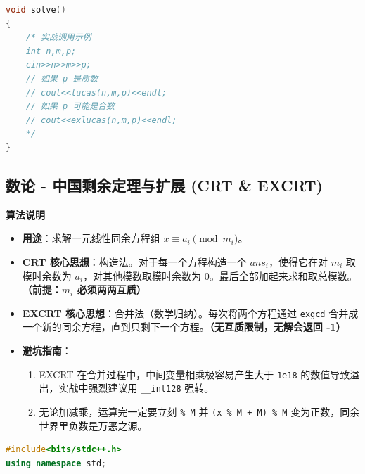 \documentclass[10pt,landscape,a4paper]{article}
\begin{document}
\begin{multicols*}{3}
\begin{lstlisting}[language=C++]
void solve()
{
    /* 实战调用示例
    int n,m,p;
    cin>>n>>m>>p;
    // 如果 p 是质数
    // cout<<lucas(n,m,p)<<endl;
    // 如果 p 可能是合数
    // cout<<exlucas(n,m,p)<<endl;
    */
}
\end{lstlisting}
\subsection*{数论 - 中国剩余定理与扩展 (CRT \& EXCRT)}
\par\addvspace{0.7ex}\noindent\textbf{算法说明}\par\nobreak
\begin{itemize}
\item \textbf{用途}：求解一元线性同余方程组 $x \equiv a_i \pmod{m_i}$。
\item \textbf{CRT 核心思想}：构造法。对于每一个方程构造一个 $ans_i$，使得它在对 $m_i$ 取模时余数为 $a_i$，对其他模数取模时余数为 $0$。最后全部加起来求和取总模数。\textbf{（前提：$m_i$ 必须两两互质）}
\item \textbf{EXCRT 核心思想}：合并法（数学归纳）。每次将两个方程通过 \texttt{e\allowbreak{}x\allowbreak{}g\allowbreak{}c\allowbreak{}d} 合并成一个新的同余方程，直到只剩下一个方程。\textbf{（无互质限制，无解会返回 -1）}
\item \textbf{避坑指南}：
\begin{enumerate}[start=1]
\item EXCRT 在合并过程中，中间变量相乘极容易产生大于 \texttt{1\allowbreak{}e\allowbreak{}1\allowbreak{}8} 的数值导致溢出，实战中强烈建议用 \texttt{\_\allowbreak{}\_\allowbreak{}i\allowbreak{}n\allowbreak{}t\allowbreak{}1\allowbreak{}2\allowbreak{}8} 强转。
\item 无论加减乘，运算完一定要立刻 \texttt{\%\allowbreak{} \allowbreak{}M} 并 \texttt{(\allowbreak{}x\allowbreak{} \allowbreak{}\%\allowbreak{} \allowbreak{}M\allowbreak{} \allowbreak{}+\allowbreak{} \allowbreak{}M\allowbreak{})\allowbreak{} \allowbreak{}\%\allowbreak{} \allowbreak{}M} 变为正数，同余世界里负数是万恶之源。
\end{enumerate}
\end{itemize}
\par{}\par
\begin{lstlisting}[language=C++]
#include<bits/stdc++.h>
using namespace std;


\end{lstlisting}
\end{multicols*}
\end{document}
